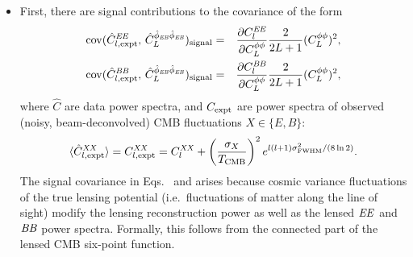 \begin{itemize}
\item First, there are signal contributions to the covariance of the form
\begin{eqnarray}
  \label{eq:covEEphiEBphiEB}
  \mathrm{cov}(\hat C^{\mathit{EE}}_{l,\mathrm{expt}},\, 
  \hat{C}^{\hat\phi_{\mathit{EB}}\hat\phi_{\mathit{EB}}}_{L})_\mathrm{signal}
&=&
\frac{\partial C^{\mathit{EE}}_l}{\partial C^{\phi\phi}_{L}}
\frac{2}{2L+1} (C^{\phi\phi}_{L})^2,\\
  \label{eq:covBBphiEBphiEB}
  \mathrm{cov}(\hat C^{\mathit{BB}}_{l,\mathrm{expt}},\, 
  \hat{C}^{\hat\phi_{\mathit{EB}}\hat\phi_{\mathit{EB}}}_{L})_\mathrm{signal}
&=&
\frac{\partial C^{\mathit{BB}}_l}{\partial C^{\phi\phi}_{L}}
\frac{2}{2L+1} (C^{\phi\phi}_{L})^2,
\end{eqnarray}
where $\hat C$ are data power spectra, and $C_{\mathrm{expt}}$ are power spectra of observed (noisy, beam-deconvolved) CMB fluctuations $X\in \{E,B\}$:
\begin{equation}
  \label{eq:CXXexptExpectation}
  \langle\hat C^{\mathit{XX}}_{l,\mathrm{expt}}\rangle = 
 C^{\mathit{XX}}_{l,\mathrm{expt}} = C^{\mathit{XX}}_{l}
+ \left(\frac{\sigma_X}{T_\mathrm{CMB}}\right)^2 
  e^{l(l+1)\sigma^2_{\mathrm{FWHM}}/(8\ln 2)}.
\end{equation}
The signal covariance in Eqs.~ and  arises because cosmic variance fluctuations of the true lensing potential (i.e.~fluctuations of matter along the line of sight) modify the lensing reconstruction power as well as the lensed $\mathit{EE}$ and $\mathit{BB}$ power spectra.  Formally, this follows from the connected part of the lensed CMB six-point function.


\end{itemize}
